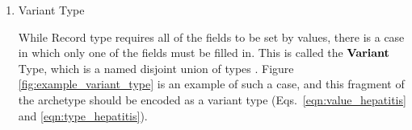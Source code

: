 \documentclass[preprint,3p,onecolumn,times,review]{article}
\begin{document}
{\begin{enumerate}
\begin{figure}[!htbp]
    \begin{alignat}{4}
        \text{Terms:} \qquad   \nonumber\\
        M~ & {::= \dots }\nonumber\\
           & | ~~ record\{l_i = M\} \qquad where~i \in 1..n & (\text{record construction}) \label{eqn:record_construction}\\
           & | ~~M.l_i    & (\text{record projection}) \label{eqn:record_projection}\\
        \text{Types:} \qquad   \nonumber\\
        \tau~  & {::= \dots}\nonumber\\
               &  |~~ \mathsf{Record}\{l_i \text{:} \tau_i \} \qquad where~i \in 1..n \label{eqn:record_type}\\
        \text{Typing rules:} \qquad   \nonumber\\
        & \frac{\Gamma \vdash M_i\text{:}\tau_i}
               {\Gamma ~ \vdash record\{l_i\text{:} M_i\}: \mathsf{Record}\{l_i \text{:} \tau_i\}} \qquad where~i \in 1..n \label{eqn:record_constructiontyping_rule} \\[6pt]
        & \frac{\Gamma \vdash M \text{:} \mathsf{Record}\{l_i \text{:} \tau_i\}}
               {\Gamma ~ \vdash M.l_i \text{:} \tau_i} \qquad where~i \in 1..n \label{eqn:record_projection_typing_rule}
     \end{alignat}
     \caption{Records}\label{fig:record_type}
\end{figure}   

\item Variant Type
  
  While {\sf Record} type requires all of the fields to be set by values, there is a case in which only one of the fields must be filled in. 
  This is called the ${\sf{\bf Variant}}$ Type, which is a named disjoint union of types \cite[p.136]{pierce02:_types_progr_languag}\cite[p.19]{cardelli04:_type_system}.
  Figure \ref{fig:example_variant_type} is an example of such a case, and this fragment of the archetype should be encoded as a variant type (Eqs.~\ref{eqn:value_hepatitis} and \ref{eqn:type_hepatitis}).


\end{enumerate}}
\end{document}
